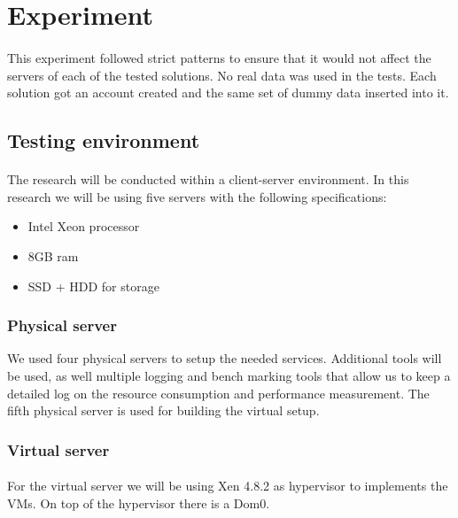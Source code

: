 \section{Experiment}
\paragraph{}
This experiment followed strict patterns to ensure that it would not affect the servers of each of the tested solutions. No real data was used in the tests. Each solution got an account created and the same set of dummy data inserted into it.


\subsection{Testing environment}
\paragraph{}
The research will be conducted within a client-server environment. In this research we will be using five servers with the following specifications:
\begin{itemize}
	\item Intel Xeon processor
	\item 8GB ram
	\item SSD + HDD for storage
\end{itemize}

\subsubsection{Physical server}
 We used four physical servers to setup the needed services. Additional tools will be used, as well multiple logging and bench marking tools that allow us to keep a detailed log on the resource consumption and performance measurement. The fifth physical server is used for building the virtual setup.

\subsubsection{Virtual server}
\paragraph{}
For the virtual server we will be using Xen 4.8.2 as hypervisor to implements the VMs. On top of the hypervisor there is a Dom0.
 
